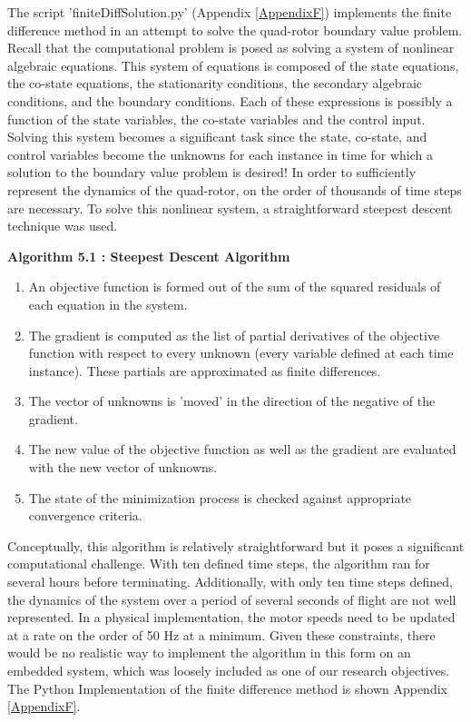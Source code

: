The script 'finiteDiffSolution.py' (Appendix \ref{AppendixF}) implements the finite difference method in an attempt to solve the quad-rotor boundary value problem. Recall that the computational problem is posed as solving a system of nonlinear algebraic equations. This system of equations is composed of the state equations, the co-state equations, the stationarity conditions, the secondary algebraic conditions, and the boundary conditions. Each of these expressions is possibly a function of the state variables, the co-state variables and the control input. Solving this system becomes a significant task since the state, co-state, and control variables become the unknowns for each instance in time for which a solution to the boundary value problem is desired! In order to sufficiently represent the dynamics of the quad-rotor, on the order of thousands of time steps are necessary. To solve this nonlinear system, a straightforward steepest descent technique was used.

\begin{center}\textbf{Algorithm 5.1 : Steepest Descent Algorithm}\end{center}
\begin{enumerate}
    \item{An objective function is formed out of the sum of the squared residuals of each equation in the system.}
    \item{The gradient is computed as the list of partial derivatives of the objective function with respect to every unknown (every variable defined at each time instance). These partials are approximated as finite differences.}
    \item{The vector of unknowns is 'moved' in the direction of the negative of the gradient.}
    \item{The new value of the objective function as well as the gradient are evaluated with the new vector of unknowns. }
    \item{The state of the minimization process is checked against appropriate convergence criteria.}
\end{enumerate}

Conceptually, this algorithm is relatively straightforward but it poses a significant computational challenge. With ten defined time steps, the algorithm ran for several hours before terminating. Additionally, with only ten time steps defined, the dynamics of the system over a period of several seconds of flight are not well represented. In a physical implementation, the motor speeds need to be updated at a rate on the order of 50 Hz at a minimum. Given  these constraints, there would be no realistic way to implement the algorithm in this form on an embedded system, which was loosely included as one of our research objectives. The Python Implementation of the finite difference method is shown Appendix \ref{AppendixF}.

